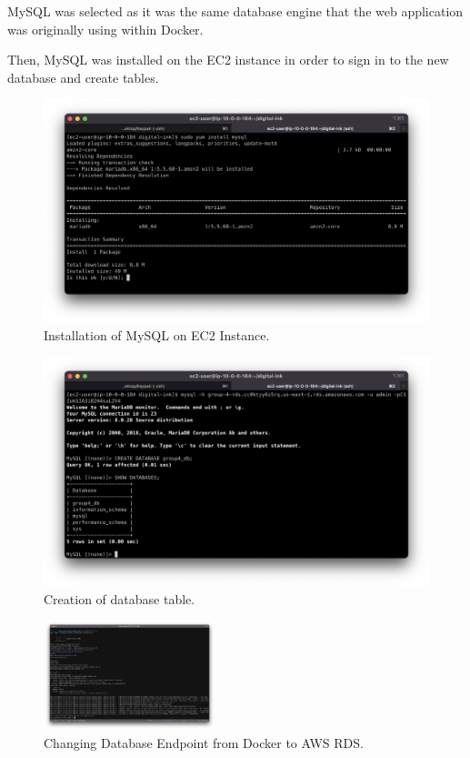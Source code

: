 MySQL was selected as it was the same database engine that the web application was originally using within Docker.

Then, MySQL was installed on the EC2 instance in order to sign in to the new database and create tables.

\begin{figure}[!htbp]
\centering
\includegraphics[width=\textwidth]{resources/rds/rds-mysql-install}
\caption{Installation of MySQL on EC2 Instance.}
\label{fig:rds-msql-install}
\end{figure}

\begin{figure}[!htbp]
\centering
\includegraphics[width=\textwidth]{resources/rds/rds-database-creation}
\caption{Creation of database table.}
\label{fig:rds-db-create-2}
\end{figure}

\begin{figure}[!htbp]
    \centering
    \includegraphics[width=50mm]{resources/rds/envupdate}
    \caption{Changing Database Endpoint from Docker to AWS RDS.}
    \label{fig:rds-env-update}
\end{figure}

